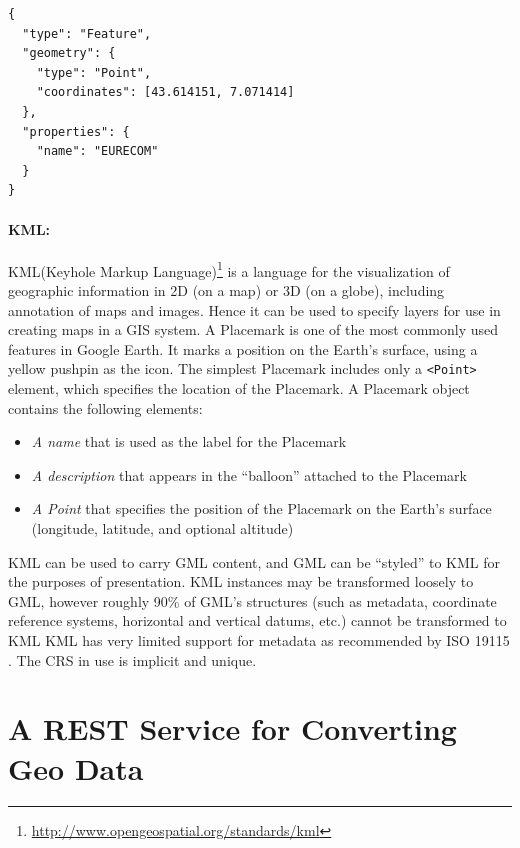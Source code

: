 \begin{verbatim}
{
  "type": "Feature",
  "geometry": {
    "type": "Point",
    "coordinates": [43.614151, 7.071414]
  },
  "properties": {
    "name": "EURECOM"
  }
}
\end{verbatim}

 
 \paragraph{KML:}
KML(Keyhole Markup Language)\footnote{\url{http://www.opengeospatial.org/standards/kml}} is a language for the visualization of geographic information in 2D (on a map) or 3D (on a globe), including annotation of maps and images. Hence it can be used to specify layers for use in creating maps in a GIS system.  A Placemark is one of the most commonly used features in Google Earth. It marks a position on the Earth's surface, using a yellow pushpin as the icon. The simplest Placemark includes only a \texttt{<Point>} element, which specifies the location of the Placemark.
A Placemark object contains the following elements:
\begin{itemize}
\item \textit{A name} that is used as the label for the Placemark
\item \textit{A description} that appears in the ``balloon'' attached to the Placemark
\item \textit{A Point} that specifies the position of the Placemark on the Earth's surface (longitude, latitude, and optional altitude)
\end{itemize}

KML can be used to carry GML content, and GML can be ``styled'' to KML for the purposes of presentation. KML instances may be transformed loosely to GML, however roughly 90\% of GML's structures (such as metadata, coordinate reference systems, horizontal and vertical datums, etc.) cannot be transformed to KML%
KML has very limited support for metadata as recommended by ISO 19115 \cite{iso19115}. The CRS in use is implicit and unique.

\section{A REST Service for Converting Geo Data}
\label{sec:rest-service}


